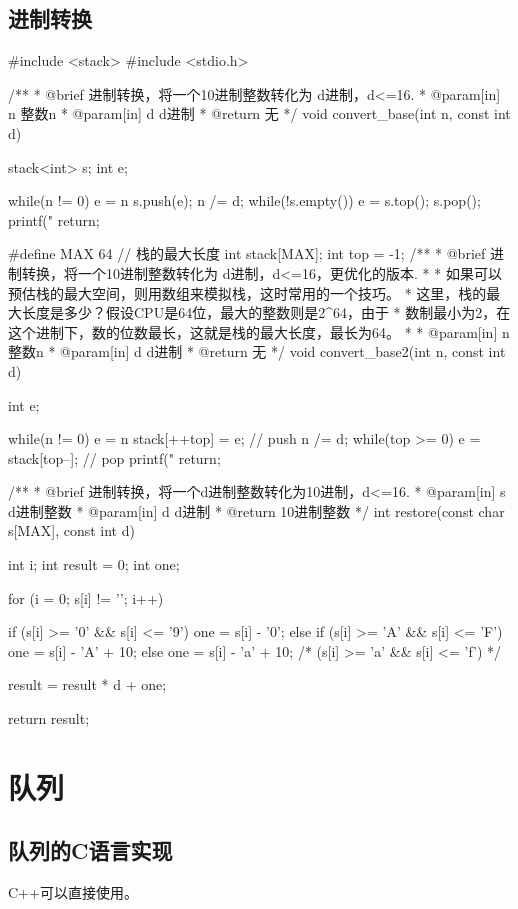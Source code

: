 \subsection{进制转换}
\begin{Codex}[label=convert_base.cpp]
#include <stack>
#include <stdio.h>

 /**
  * @brief 进制转换，将一个10进制整数转化为 d进制，d<=16.
  * @param[in] n 整数n
  * @param[in] d d进制
  * @return 无
  */
void convert_base(int n, const int d) {
    stack<int> s;
    int e;

    while(n != 0) {
        e = n %
        s.push(e);
        n /= d;
    }
    while(!s.empty()) {
        e = s.top();
        s.pop();
        printf("%
    }
    return;
}

#define MAX 64 // 栈的最大长度
int stack[MAX];
int top = -1;
/**
 * @brief 进制转换，将一个10进制整数转化为 d进制，d<=16，更优化的版本.
 *
 * 如果可以预估栈的最大空间，则用数组来模拟栈，这时常用的一个技巧。
 * 这里，栈的最大长度是多少？假设CPU是64位，最大的整数则是2^64，由于
 * 数制最小为2，在这个进制下，数的位数最长，这就是栈的最大长度，最长为64。
 *
 * @param[in] n 整数n
 * @param[in] d d进制
 * @return 无
 */
void convert_base2(int n, const int d) {
    int e;

    while(n != 0) {
        e = n %
        stack[++top] = e; // push
        n /= d;
    }
    while(top >= 0) {
        e = stack[top--]; // pop
        printf("%
    }
    return;
}


/**
 * @brief 进制转换，将一个d进制整数转化为10进制，d<=16.
 * @param[in] s d进制整数
 * @param[in] d d进制
 * @return 10进制整数
 */
int restore(const char s[MAX], const int d) {
    int i;
    int result = 0;
    int one;

    for (i = 0; s[i] != '\0'; i++) {
        if (s[i] >= '0' && s[i] <= '9') one = s[i] - '0';
        else if (s[i] >= 'A' && s[i] <= 'F') one = s[i] - 'A' + 10;
        else one = s[i] - 'a' + 10; /* (s[i] >= 'a' && s[i] <= 'f') */
        
        result = result * d + one;
    }
    return result;
}
\end{Codex}

\section{队列} %

\subsection{队列的C语言实现}
C++可以直接使用。

